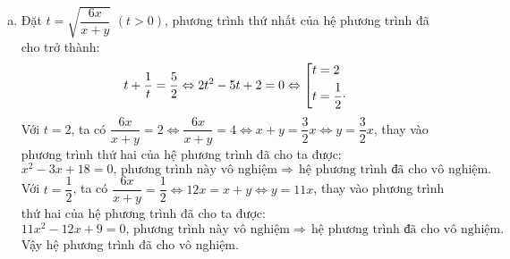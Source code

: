 \begin{ex}
{\begin{enumerate}[a)]
        			Vậy hệ phương trình đã cho có tập nghiệm $S = \left\lbrace (1; 4), (4; 1) \right\rbrace$.
			\item Đặt $t = \sqrt{\dfrac{6x}{x + y}}$ $(t > 0)$, phương trình thứ nhất của hệ phương trình đã cho trở thành:
					$$t + \dfrac{1}{t} = \dfrac{5}{2} \Leftrightarrow 2t^2 - 5t + 2 = 0 \Leftrightarrow \left[\begin{aligned}&t = 2 \\&t = \dfrac{1}{2}\cdot\end{aligned}\right.$$
					Với $t = 2$, ta có $\dfrac{6x}{x + y} = 2 \Leftrightarrow \dfrac{6x}{x + y} = 4 \Leftrightarrow x + y = \dfrac{3}{2}x \Leftrightarrow y = \dfrac{3}{2}x$, thay vào phương trình thứ hai của hệ phương trình đã cho ta được:
					$$x^2 - 3x + 18 = 0, \,\text{phương trình này vô nghiệm} \Rightarrow \,\text{hệ phương trình đã cho vô nghiệm.}$$
					Với $t = \dfrac{1}{2}$, ta có $\dfrac{6x}{x + y} = \dfrac{1}{2} \Leftrightarrow 12x = x + y \Leftrightarrow y = 11x$, thay vào phương trình thứ hai của hệ phương trình đã cho ta được:
					$$11x^2 - 12x + 9 = 0, \,\text{phương trình này vô nghiệm} \Rightarrow \,\text{hệ phương trình đã cho vô nghiệm.}$$
					Vậy hệ phương trình đã cho vô nghiệm.
		\end{enumerate}   
    }
\end{ex}

